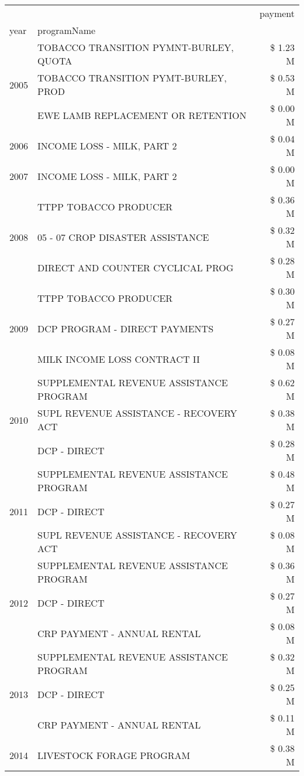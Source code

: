 \begin{tabular}{llr}
\toprule
 &  & payment \\
year & programName &  \\
\midrule
\multirow[t]{3}{*}{2005} & TOBACCO TRANSITION PYMNT-BURLEY, QUOTA & \$ 1.23 M \\
 & TOBACCO TRANSITION PYMT-BURLEY, PROD & \$ 0.53 M \\
 & EWE LAMB REPLACEMENT OR RETENTION & \$ 0.00 M \\
\cline{1-3}
2006 & INCOME LOSS - MILK, PART 2 & \$ 0.04 M \\
\cline{1-3}
2007 & INCOME LOSS - MILK, PART 2 & \$ 0.00 M \\
\cline{1-3}
\multirow[t]{3}{*}{2008} & TTPP TOBACCO PRODUCER & \$ 0.36 M \\
 & 05 - 07 CROP DISASTER ASSISTANCE & \$ 0.32 M \\
 & DIRECT AND COUNTER CYCLICAL PROG & \$ 0.28 M \\
\cline{1-3}
\multirow[t]{3}{*}{2009} & TTPP TOBACCO PRODUCER & \$ 0.30 M \\
 & DCP PROGRAM - DIRECT PAYMENTS & \$ 0.27 M \\
 & MILK INCOME LOSS CONTRACT II & \$ 0.08 M \\
\cline{1-3}
\multirow[t]{3}{*}{2010} & SUPPLEMENTAL REVENUE ASSISTANCE PROGRAM & \$ 0.62 M \\
 & SUPL REVENUE ASSISTANCE - RECOVERY ACT & \$ 0.38 M \\
 & DCP - DIRECT & \$ 0.28 M \\
\cline{1-3}
\multirow[t]{3}{*}{2011} & SUPPLEMENTAL REVENUE ASSISTANCE PROGRAM & \$ 0.48 M \\
 & DCP - DIRECT & \$ 0.27 M \\
 & SUPL REVENUE ASSISTANCE - RECOVERY ACT & \$ 0.08 M \\
\cline{1-3}
\multirow[t]{3}{*}{2012} & SUPPLEMENTAL REVENUE ASSISTANCE PROGRAM & \$ 0.36 M \\
 & DCP - DIRECT & \$ 0.27 M \\
 & CRP PAYMENT - ANNUAL RENTAL & \$ 0.08 M \\
\cline{1-3}
\multirow[t]{3}{*}{2013} & SUPPLEMENTAL REVENUE ASSISTANCE PROGRAM & \$ 0.32 M \\
 & DCP - DIRECT & \$ 0.25 M \\
 & CRP PAYMENT - ANNUAL RENTAL & \$ 0.11 M \\
\cline{1-3}
\multirow[t]{3}{*}{2014} & LIVESTOCK FORAGE PROGRAM & \$ 0.38 M \\

\end{tabular}
